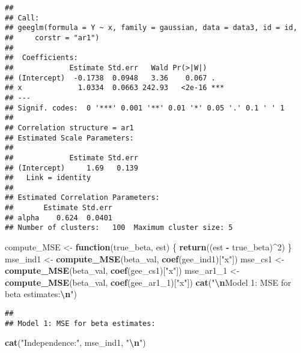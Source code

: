 \documentclass[
]{article}
\newenvironment{Shaded}{\begin{snugshade}}{\end{snugshade}}
\newcommand{\ControlFlowTok}[1]{\textcolor[rgb]{0.13,0.29,0.53}{\textbf{#1}}}
\newcommand{\DecValTok}[1]{\textcolor[rgb]{0.00,0.00,0.81}{#1}}
\newcommand{\FunctionTok}[1]{\textcolor[rgb]{0.13,0.29,0.53}{\textbf{#1}}}
\newcommand{\NormalTok}[1]{#1}
\newcommand{\OtherTok}[1]{\textcolor[rgb]{0.56,0.35,0.01}{#1}}
\newcommand{\SpecialCharTok}[1]{\textcolor[rgb]{0.81,0.36,0.00}{\textbf{#1}}}
\newcommand{\StringTok}[1]{\textcolor[rgb]{0.31,0.60,0.02}{#1}}
\begin{document}
\begin{verbatim}
## 
## Call:
## geeglm(formula = Y ~ x, family = gaussian, data = data3, id = id, 
##     corstr = "ar1")
## 
##  Coefficients:
##             Estimate Std.err   Wald Pr(>|W|)    
## (Intercept)  -0.1738  0.0948   3.36    0.067 .  
## x             1.0334  0.0663 242.93   <2e-16 ***
## ---
## Signif. codes:  0 '***' 0.001 '**' 0.01 '*' 0.05 '.' 0.1 ' ' 1
## 
## Correlation structure = ar1 
## Estimated Scale Parameters:
## 
##             Estimate Std.err
## (Intercept)     1.69   0.139
##   Link = identity 
## 
## Estimated Correlation Parameters:
##       Estimate Std.err
## alpha    0.624  0.0401
## Number of clusters:   100  Maximum cluster size: 5
\end{verbatim}

\begin{Shaded}
\begin{Highlighting}[]
\NormalTok{compute\_MSE }\OtherTok{\textless{}{-}} \ControlFlowTok{function}\NormalTok{(true\_beta, est) \{}
  \FunctionTok{return}\NormalTok{((est }\SpecialCharTok{{-}}\NormalTok{ true\_beta)}\SpecialCharTok{\^{}}\DecValTok{2}\NormalTok{)}
\NormalTok{\}}
\NormalTok{mse\_ind1 }\OtherTok{\textless{}{-}} \FunctionTok{compute\_MSE}\NormalTok{(beta\_val, }\FunctionTok{coef}\NormalTok{(gee\_ind1)[}\StringTok{"x"}\NormalTok{])}
\NormalTok{mse\_cs1  }\OtherTok{\textless{}{-}} \FunctionTok{compute\_MSE}\NormalTok{(beta\_val, }\FunctionTok{coef}\NormalTok{(gee\_cs1)[}\StringTok{"x"}\NormalTok{])}
\NormalTok{mse\_ar1\_1 }\OtherTok{\textless{}{-}} \FunctionTok{compute\_MSE}\NormalTok{(beta\_val, }\FunctionTok{coef}\NormalTok{(gee\_ar1\_1)[}\StringTok{"x"}\NormalTok{])}
\FunctionTok{cat}\NormalTok{(}\StringTok{"}\SpecialCharTok{\textbackslash{}n}\StringTok{Model 1: MSE for beta estimates:}\SpecialCharTok{\textbackslash{}n}\StringTok{"}\NormalTok{)}
\end{Highlighting}
\end{Shaded}

\begin{verbatim}
## 
## Model 1: MSE for beta estimates:
\end{verbatim}

\begin{Shaded}
\begin{Highlighting}[]
\FunctionTok{cat}\NormalTok{(}\StringTok{"Independence:"}\NormalTok{, mse\_ind1, }\StringTok{"}\SpecialCharTok{\textbackslash{}n}\StringTok{"}\NormalTok{)}
\end{Highlighting}
\end{Shaded}
\end{document}
